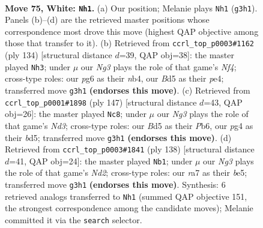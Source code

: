 \documentclass[11pt]{article}
\begin{document}
\clearpage

\begin{figure}[p]\centering
\begin{subfigure}{0.46\textwidth}\centering
\resizebox{\linewidth}{!}{%
\newchessgame
\chessboard[
  setfen={8/r4p2/n5p1/3BP2p/b4Pp1/6N1/3k1K1P/8 w - - 8 75},
  showmover=false,
  pgfstyle=straightmove, color=movearrow, markmove={g3-h1}
]}
\caption{}
\end{subfigure}\hfill
\begin{subfigure}{0.46\textwidth}\centering
\resizebox{\linewidth}{!}{%
\newchessgame
\chessboard[
  setfen={8/8/5kp1/P1p2p1p/1n2pN1P/1P4P1/3K4/8 w - - 15 68},
  showmover=false,
  pgfstyle=straightmove, color=movearrow, markmove={f4-h3}
]}
\caption{}
\end{subfigure}
\\[4pt]
\begin{subfigure}{0.46\textwidth}\centering
\resizebox{\linewidth}{!}{%
\newchessgame
\chessboard[
  setfen={8/4k3/1p1n4/3Bp2p/1P2P1pP/3K2P1/8/8 b - - 9 74},
  showmover=false,
  pgfstyle=straightmove, color=movearrow, markmove={d6-c8}
]}
\caption{}
\end{subfigure}\hfill
\begin{subfigure}{0.46\textwidth}\centering
\resizebox{\linewidth}{!}{%
\newchessgame
\chessboard[
  setfen={1n6/4B3/6p1/3kbp2/4p3/4P2P/3NK1P1/8 w - - 16 70},
  showmover=false,
  pgfstyle=straightmove, color=movearrow, markmove={d2-b1}
]}
\caption{}
\end{subfigure}
\caption{\textbf{Move 75, White: \texttt{Nh1}.} (a) Our position; Melanie plays \texttt{Nh1} (\texttt{g3h1}). Panels (b)--(d) are the retrieved master positions whose correspondence most drove this move (highest QAP objective among those that transfer to it). (b) Retrieved from \texttt{ccrl\_top\_p0003\#1162} (ply 134) [structural distance $d$=39, QAP obj=38]: the master played \texttt{Nh3}; under $\mu$ our \emph{Ng3} plays the role of that game's \emph{Nf4}; cross-type roles: our \emph{p}g6 as their \emph{n}b4, our \emph{B}d5 as their \emph{p}e4; transferred move \texttt{g3h1} \textbf{(endorses this move)}. (c) Retrieved from \texttt{ccrl\_top\_p0001\#1898} (ply 147) [structural distance $d$=43, QAP obj=26]: the master played \texttt{Nc8}; under $\mu$ our \emph{Ng3} plays the role of that game's \emph{Nd3}; cross-type roles: our \emph{B}d5 as their \emph{P}b6, our \emph{p}g4 as their \emph{b}d5; transferred move \texttt{g3h1} \textbf{(endorses this move)}. (d) Retrieved from \texttt{ccrl\_top\_p0003\#1841} (ply 138) [structural distance $d$=41, QAP obj=24]: the master played \texttt{Nb1}; under $\mu$ our \emph{Ng3} plays the role of that game's \emph{Nd2}; cross-type roles: our \emph{r}a7 as their \emph{b}e5; transferred move \texttt{g3h1} \textbf{(endorses this move)}. Synthesis: 6 retrieved analogs transferred to \texttt{Nh1} (summed QAP objective 151, the strongest correspondence among the candidate moves); Melanie committed it via the \texttt{search} selector.}
\label{fig:thought-m148}
\end{figure}
\end{document}
